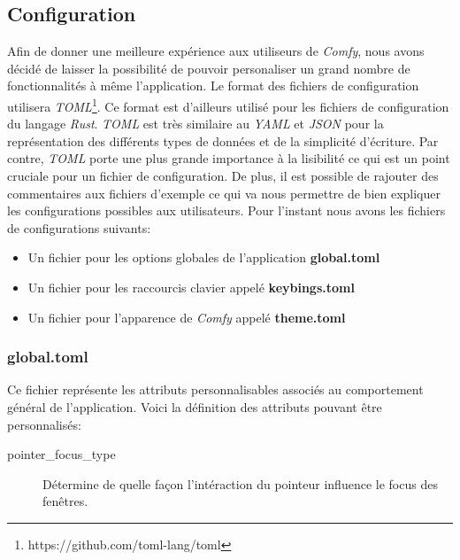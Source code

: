 \documentclass[titlepage]{article}
\begin{document}
\subsection{Configuration}
\par
\bigskip
Afin de donner une meilleure expérience aux utiliseurs de \textit{Comfy}, nous avons décidé de laisser la possibilité de pouvoir personaliser un grand nombre de fonctionnalités à même l'application. Le format des fichiers de configuration utilisera \textit{TOML}\footnote{https://github.com/toml-lang/toml}. Ce format est d'ailleurs utilisé pour les fichiers de configuration du langage \textit{Rust}. \textit{TOML} est très similaire au \textit{YAML} et \textit{JSON} pour la représentation des différents types de données et de la simplicité d'écriture. Par contre, \textit{TOML} porte une plus grande importance à la lisibilité ce qui est un point cruciale pour un fichier de configuration. De plus, il est possible de rajouter des commentaires aux fichiers d'exemple ce qui va nous permettre de bien expliquer les configurations possibles aux utilisateurs. Pour l'instant nous avons les fichiers de configurations suivants:
\begin{itemize}
	\item Un fichier pour les options globales de l'application \textbf{global.toml}
	\item Un fichier pour les raccourcis clavier appelé \textbf{keybings.toml}
	\item Un fichier pour l'apparence de \textit{Comfy} appelé \textbf{theme.toml}
\end{itemize}

\subsubsection{global.toml}
\begin{minipage}{\linewidth}
	
\end{minipage}

\par
Ce fichier représente les attributs personnalisables associés au comportement général de l'application. Voici la définition des attributs pouvant être personnalisés:
\begin{description}
	\item [pointer\_focus\_type] Détermine de quelle façon l'intéraction du pointeur influence le focus des fenêtres.
\end{description}
\end{document}

